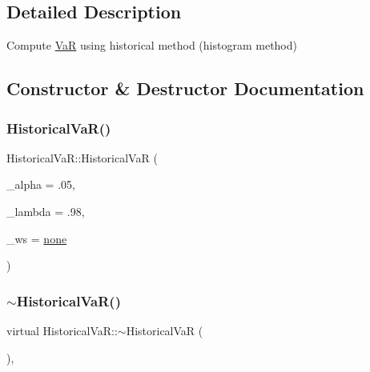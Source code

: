 \subsection{Detailed Description}
Compute \hyperlink{classVaR}{VaR} using historical method (histogram method) 

\subsection{Constructor \& Destructor Documentation}
\hypertarget{classHistoricalVaR_a2f98a84f410ee519c1d08cb3a4e5110f}{}\label{classHistoricalVaR_a2f98a84f410ee519c1d08cb3a4e5110f} 
\subsubsection{\texorpdfstring{Historical\+Va\+R()}{HistoricalVaR()}\hspace{0.1cm}{\footnotesize\ttfamily [1/2]}}
{\footnotesize\ttfamily Historical\+Va\+R\+::\+Historical\+VaR (\begin{DoxyParamCaption}\item[{double}]{\+\_\+alpha = {\ttfamily .05},  }\item[{double}]{\+\_\+lambda = {\ttfamily .98},  }\item[{\hyperlink{var__model_8h_a05de9d7b6ad30cf17cd8f840666921de}{Weighting\+Scheme}}]{\+\_\+ws = {\ttfamily \hyperlink{var__model_8h_a05de9d7b6ad30cf17cd8f840666921deab7e4e0120a041dbe6528b050c04269e0}{none}} }\end{DoxyParamCaption})}

\hypertarget{classHistoricalVaR_ac0b1889d5ba5e3a3efb0d23eaff525a5}{}\label{classHistoricalVaR_ac0b1889d5ba5e3a3efb0d23eaff525a5} 
\subsubsection{\texorpdfstring{$\sim$\+Historical\+Va\+R()}{~HistoricalVaR()}}
{\footnotesize\ttfamily virtual Historical\+Va\+R\+::$\sim$\+Historical\+VaR (\begin{DoxyParamCaption}{ }\end{DoxyParamCaption})\hspace{0.3cm}{\ttfamily [inline]}, {\ttfamily [virtual]}}

